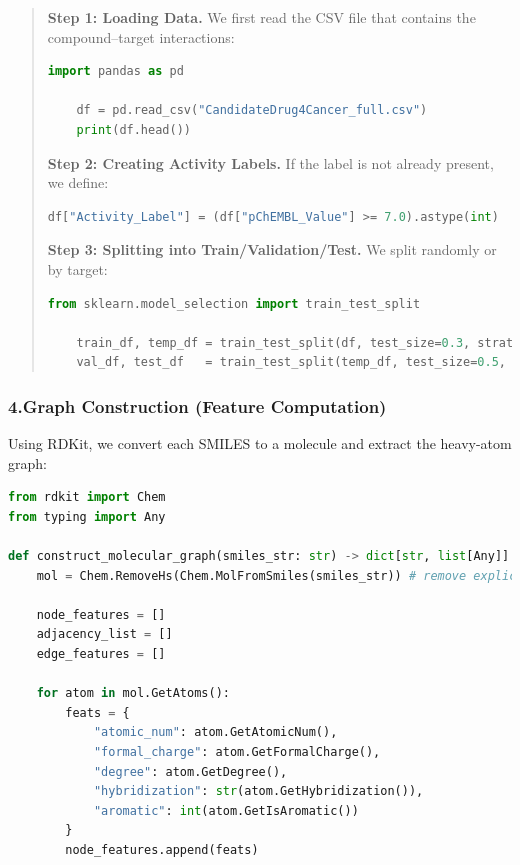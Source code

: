 \documentclass[fontsize=11pt]{article}
\begin{document}
\begin{itemize}
\begin{quote}
    \textbf{Step 1: Loading Data.} We first read the CSV file that contains the compound--target interactions:
    \begin{lstlisting}[language=Python]
    import pandas as pd
    
    df = pd.read_csv("CandidateDrug4Cancer_full.csv") 
    print(df.head())
    \end{lstlisting}
    
    \noindent
    \textbf{Step 2: Creating Activity Labels.} If the label is not already present, we define:
    \begin{lstlisting}[language=Python]
    df["Activity_Label"] = (df["pChEMBL_Value"] >= 7.0).astype(int)
    \end{lstlisting}
    
    \noindent
    \textbf{Step 3: Splitting into Train/Validation/Test.} We split randomly or by target:
    \begin{lstlisting}[language=Python]
    from sklearn.model_selection import train_test_split
    
    train_df, temp_df = train_test_split(df, test_size=0.3, stratify=df["Activity_Label"])
    val_df, test_df   = train_test_split(temp_df, test_size=0.5, stratify=temp_df["Activity_Label"])
    \end{lstlisting}
\end{quote}

\subsubsection*{4.\quad Graph Construction (Feature Computation)}
Using RDKit, we convert each SMILES to a molecule and extract the heavy-atom graph:
\begin{lstlisting}[language=Python]
from rdkit import Chem
from typing import Any

def construct_molecular_graph(smiles_str: str) -> dict[str, list[Any]]:
    mol = Chem.RemoveHs(Chem.MolFromSmiles(smiles_str)) # remove explicit H atoms

    node_features = []
    adjacency_list = []
    edge_features = []

    for atom in mol.GetAtoms():
        feats = {
            "atomic_num": atom.GetAtomicNum(),
            "formal_charge": atom.GetFormalCharge(),
            "degree": atom.GetDegree(),
            "hybridization": str(atom.GetHybridization()),
            "aromatic": int(atom.GetIsAromatic())
        }
        node_features.append(feats)


\end{lstlisting}
\end{itemize}
\end{document}
